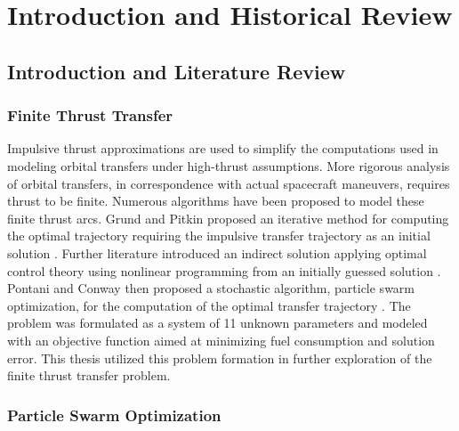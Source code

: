 \chapter{Introduction and Historical Review}
\newpage

\section{Introduction and Literature Review}

\subsection{Finite Thrust Transfer}

\noindent Impulsive thrust approximations are used to simplify the computations used in modeling orbital transfers under high-thrust assumptions.
More rigorous analysis of orbital transfers, in correspondence with actual spacecraft maneuvers, requires thrust to be finite. Numerous algorithms have been
proposed to model these finite thrust arcs. Grund and Pitkin proposed an iterative method for computing the optimal trajectory requiring the impulsive transfer trajectory as
an initial solution \citep{Fthrust1}. Further literature introduced an indirect solution applying optimal control theory using nonlinear programming from an initially guessed
solution \citep{Fthrust2}. Pontani and Conway then proposed a stochastic algorithm, particle swarm optimization, for the computation of the optimal transfer trajectory \citep{Pontani_Conway}. The problem was formulated as 
a system of 11 unknown parameters and modeled with an objective function aimed at minimizing fuel consumption
and solution error. This thesis utilized this problem formation in further exploration of the finite thrust transfer problem.

\subsection{Particle Swarm Optimization}

